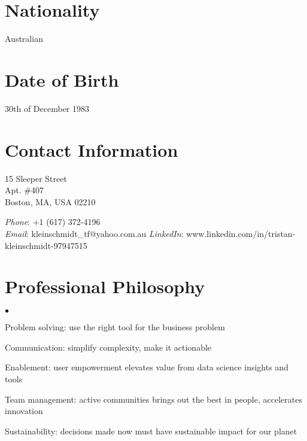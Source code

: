 \documentclass[margin,line]{resume}
\newenvironment{list2}{
  \begin{list}{$\bullet$}{%
      \setlength{\itemsep}{0in}
      \setlength{\parsep}{0in} \setlength{\parskip}{0in}
      \setlength{\topsep}{0in} \setlength{\partopsep}{0in}
      \setlength{\leftmargin}{0.2in}}}{\end{list}}
\begin{document}
\begin{resume}

\section{\sc Nationality}
Australian

\section{\sc Date of Birth}
30th of December 1983

\section{\sc Contact Information}

\parbox[t]{3.3in}{%
15 Sleeper Street\\
Apt. \#407\\
Boston, MA, USA 02210}
\parbox[t]{2.3in}{%
{\it Phone}: {+1 (617) 372-4196}  \\
{\it Email}: {kleinschmidt\_tf@yahoo.com.au}
{\it LinkedIn}: {www.linkedin.com/in/tristan-kleinschmidt-97947515}
}


\section{\sc Professional Philosophy}
\begin{list2}
\item Problem solving: use the right tool for the business problem
\item Communication: simplify complexity, make it actionable
\item Enablement: user empowerment elevates value from data science insights and tools
\item Team management: active communities brings out the best in people, accelerates innovation
\item Sustainability: decisions made now must have sustainable impact for our planet
\end{list2}


\end{resume}
\end{document}
